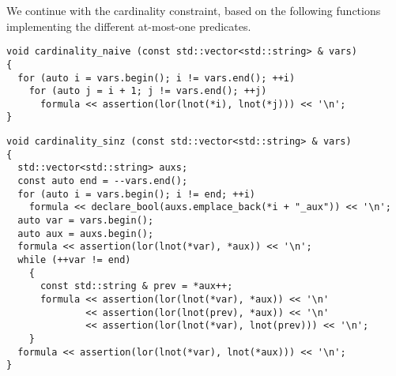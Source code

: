 \noindent
We continue with the cardinality constraint, based on the following functions implementing the different at-most-one predicates.

\begin{lstlisting}[style=c++]
void cardinality_naive (const std::vector<std::string> & vars)
{
  for (auto i = vars.begin(); i != vars.end(); ++i)
    for (auto j = i + 1; j != vars.end(); ++j)
      formula << assertion(lor(lnot(*i), lnot(*j))) << '\n';
}
\end{lstlisting}


\begin{lstlisting}[style=c++]
void cardinality_sinz (const std::vector<std::string> & vars)
{
  std::vector<std::string> auxs;
  const auto end = --vars.end();
  for (auto i = vars.begin(); i != end; ++i)
    formula << declare_bool(auxs.emplace_back(*i + "_aux")) << '\n';
  auto var = vars.begin();
  auto aux = auxs.begin();
  formula << assertion(lor(lnot(*var), *aux)) << '\n';
  while (++var != end)
    {
      const std::string & prev = *aux++;
      formula << assertion(lor(lnot(*var), *aux)) << '\n'
              << assertion(lor(lnot(prev), *aux)) << '\n'
              << assertion(lor(lnot(*var), lnot(prev))) << '\n';
    }
  formula << assertion(lor(lnot(*var), lnot(*aux))) << '\n';
}
\end{lstlisting}

%
%
%

